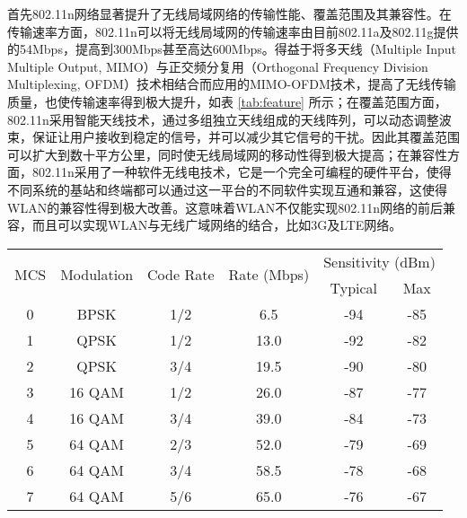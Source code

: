 首先802.11n网络显著提升了无线局域网络的传输性能、覆盖范围及其兼容性。在传输速率方面，802.11n可以将无线局域网的传输速率由目前802.11a及802.11g提供的54Mbps，提高到300Mbps甚至高达600Mbps。得益于将多天线（Multiple Input Multiple Output, MIMO）与正交频分复用（Orthogonal Frequency Division Multiplexing, OFDM）技术相结合而应用的MIMO-OFDM技术，提高了无线传输质量，也使传输速率得到极大提升，如表 \ref{tab:feature} 所示；在覆盖范围方面，802.11n采用智能天线技术，通过多组独立天线组成的天线阵列，可以动态调整波束，保证让用户接收到稳定的信号，并可以减少其它信号的干扰。因此其覆盖范围可以扩大到数十平方公里，同时使无线局域网的移动性得到极大提高；在兼容性方面，802.11n采用了一种软件无线电技术，它是一个完全可编程的硬件平台，使得不同系统的基站和终端都可以通过这一平台的不同软件实现互通和兼容，这使得WLAN的兼容性得到极大改善。这意味着WLAN不仅能实现802.11n网络的前后兼容，而且可以实现WLAN与无线广域网络的结合，比如3G及LTE网络。

\begin{table}[!htp]
\renewcommand{\arraystretch}{1}
\centering
\begin{threeparttable}[b]
\begin{tabular}{cccccc}
\hline
  \multirow{2}{*}{MCS} & \multirow{2}{*}{Modulation} & \multirow{2}{*}{Code Rate} & \multirow{2}{*}{Rate (Mbps)} & \multicolumn{2}{c}{Sensitivity (dBm)} \\
\cline{5-6}
  & & & & Typical & Max \\
\hline
  0 & BPSK & 1/2 & 6.5 & -94 & -85 \\
  1 & QPSK & 1/2 & 13.0 & -92 & -82 \\
  2 & QPSK & 3/4 & 19.5 & -90 & -80 \\
  3 & 16 QAM & 1/2 & 26.0 & -87 & -77 \\
  4 & 16 QAM & 3/4 & 39.0 & -84 & -73 \\
  5 & 64 QAM & 2/3 & 52.0 & -79 & -69 \\
  6 & 64 QAM & 3/4 & 58.5 & -78 & -68 \\
  7 & 64 QAM & 5/6 & 65.0 & -76 & -67 \\
\hline
\end{tabular}
\end{threeparttable}
\end{table}

